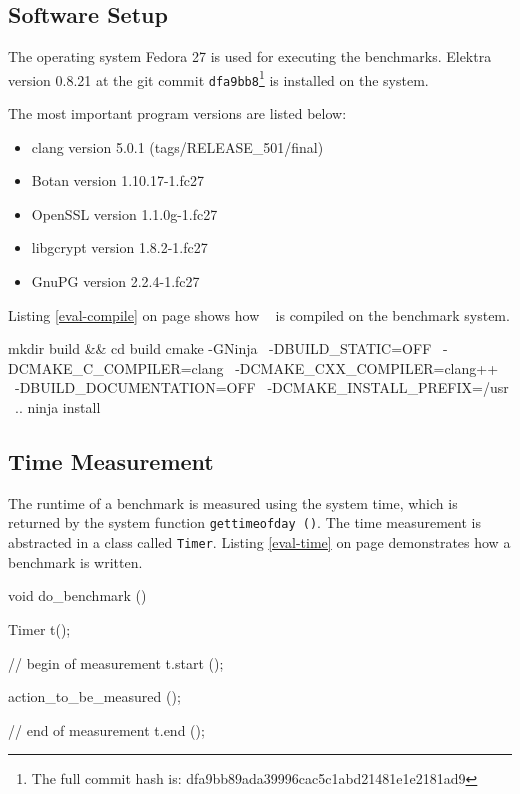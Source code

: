   \subsection{Software Setup}

The operating system Fedora 27 is used for executing the benchmarks.
Elektra version 0.8.21 at the git commit \texttt{dfa9bb8}\footnote{The full commit hash is: dfa9bb89ada39996cac5c1abd21481e1e2181ad9} is installed on the system.

The most important program versions are listed below:

\begin{itemize}
  \item clang version 5.0.1 (tags/RELEASE\_501/final)
  \item Botan version 1.10.17-1.fc27
  \item OpenSSL version 1.1.0g-1.fc27
  \item libgcrypt version 1.8.2-1.fc27
  \item GnuPG version 2.2.4-1.fc27
\end{itemize}

Listing \ref{eval-compile} on page \pageref{eval-compile} shows how \elektra ~ is compiled on the benchmark system.

\begin{code}[label=eval-compile,language=bash,caption={Elektra compile options for the benchmarks}]
mkdir build && cd build
cmake -GNinja \
    -DBUILD_STATIC=OFF \
    -DCMAKE_C_COMPILER=clang \
    -DCMAKE_CXX_COMPILER=clang++ \
    -DBUILD_DOCUMENTATION=OFF \
    -DCMAKE_INSTALL_PREFIX=/usr \
    ..
ninja install
\end{code}

  \subsection{Time Measurement}

The runtime of a benchmark is measured using the system time, which is returned by the system function \texttt{gettimeofday ()}.
The time measurement is abstracted in a class called \texttt{Timer}.
Listing \ref{eval-time} on page \pageref{eval-time} demonstrates how a benchmark is written.

\begin{code}[label=eval-time,language=C,caption={Time measurement for the benchmarks}]
void do_benchmark ()
{
  Timer t();

  // begin of measurement
  t.start ();

  action_to_be_measured ();

  // end of measurement
  t.end ();
}
\end{code}

